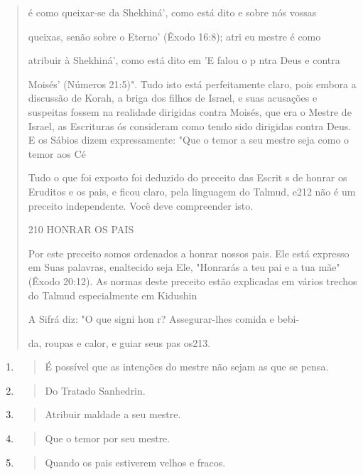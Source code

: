 \begin{quote}
é como queixar-se da Shekhiná', como está dito e sobre nós vossas

queixas, senão sobre o Eterno' (Êxodo 16:8); atri eu mestre é como

atribuir à Shekhiná', como está dito em 'E falou o p ntra Deus e contra

Moisés' (Números 21:5)". Tudo isto está perfeitamente claro, pois embora
a dis­cussão de Korah, a briga dos filhos de Israel, e suas acusações e
suspeitas fos­sem na realidade dirigidas contra Moisés, que era o Mestre
de Israel, as Escritu­ras ós consideram como tendo sido dirigidas contra
Deus. E os Sábios dizem expressamente: "Que o temor a seu mestre seja
como o temor aos Cé

Tudo o que foi exposto foi deduzido do preceito das Escrit s de honrar
os Eruditos e os pais, e ficou claro, pela linguagem do Talmud, e212 não
é um preceito independente. Você deve compreender isto.

210 HONRAR OS PAIS

Por este preceito somos ordenados a honrar nossos pais. Ele está
ex­presso em Suas palavras, enaltecido seja Ele, "Honrarás a teu pai e a
tua mãe" (Êxodo 20:12). As normas deste preceito estão explicadas em
vários trechos do Talmud especialmente em Kidushin

A Sifrá diz: "O que signi hon r? Assegurar-lhes comida e bebi-

da, roupas e calor, e guiar seus pas os213.
\end{quote}

\begin{enumerate}
\def\labelenumi{\arabic{enumi}.}
\setcounter{enumi}{208}
\item
  \begin{quote}
  É possível que as intenções do mestre não sejam as que se pensa.
  \end{quote}
\item
  \begin{quote}
  Do Tratado Sanhedrin.
  \end{quote}
\item
  \begin{quote}
  Atribuir maldade a seu mestre.
  \end{quote}
\item
  \begin{quote}
  Que o temor por seu mestre.
  \end{quote}
\item
  \begin{quote}
  Quando os pais estiverem velhos e fracos.
  \end{quote}
\end{enumerate}

